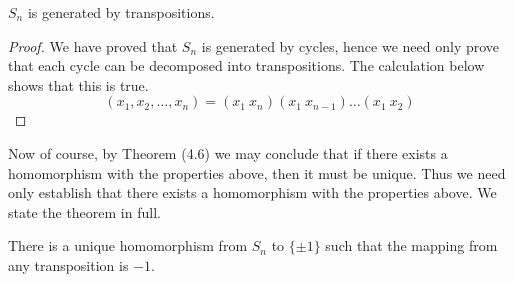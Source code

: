 \begin{lemma}
    $S_n$ is generated by transpositions.
\end{lemma}
\begin{proof}
    We have proved that $S_n$ is generated by cycles, hence we need only prove that each cycle can be decomposed into transpositions. The calculation below shows that this is true.
    \[ (x_1, x_2, \dots, x_n) = (x_1\ x_n) (x_1\ x_{n-1}) \dots (x_1\ x_2) \]
\end{proof}

Now of course, by Theorem (4.6) we may conclude that if there exists a homomorphism with the properties above, then it must be unique. Thus we need only establish that there exists a homomorphism with the properties above. We state the theorem in full.

\begin{theorem}
    There is a unique homomorphism from $S_n$ to $\{ \pm 1 \}$ such that the mapping from any transposition is $-1$.
\end{theorem}
